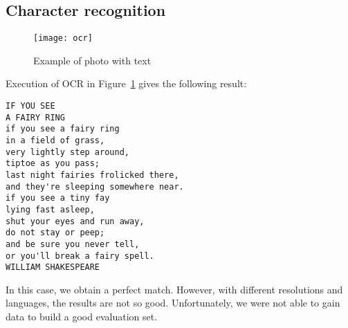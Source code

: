 \subsection{Character recognition}

\begin{figure}[H]
\centering
\texttt{[image: ocr]}
\caption{Example of photo with text}
\label{testOCR}
\end{figure}

Execution of OCR in Figure~\ref{testOCR} gives the following result:
\begin{lstlisting}
IF YOU SEE
A FAIRY RING
if you see a fairy ring
in a field of grass,
very lightly step around,
tiptoe as you pass;
last night fairies frolicked there,
and they're sleeping somewhere near.
if you see a tiny fay
lying fast asleep,
shut your eyes and run away,
do not stay or peep;
and be sure you never tell,
or you'll break a fairy spell.
WILLIAM SHAKESPEARE
\end{lstlisting}

In this case, we obtain a perfect match. However, with different resolutions and languages, the results are not so good. Unfortunately, we were not able to gain data to build a good evaluation set.